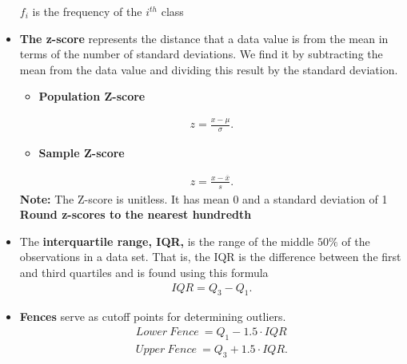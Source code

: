 \documentclass{report}
\begin{document}
\begin{itemize}
                $f_{i}$ is the frequency of the $i^{th}$ class
             \item \textbf{The z-score} represents the distance that a data value is from the mean in terms of the number of standard deviations. We find it by subtracting the mean from the data value and dividing this result by the standard deviation.
                 \begin{itemize}
                     \item \textbf{Population Z-score}
                 \end{itemize}
                 \begin{align*}
                      z = \frac{x - \mu}{\sigma}
                 .\end{align*}
                 \begin{itemize}
                     \item \textbf{Sample Z-score}
                 \end{itemize}
                 \begin{align*}
                     z =\frac{x-\overline{x}}{s}
                 .\end{align*}
                 \textbf{Note:} The Z-score is unitless. It has mean  0 and a standard deviation of 1 \\
                 \textbf{Round z-scores to the nearest hundredth}
                \item The \textbf{interquartile range, IQR,} is the range of the middle $50\% $  of the observations in a data set. That is, the IQR is the difference between the first and third quartiles and is found using this formula  
                    \begin{align*}
                        IQR = Q_{3} - Q_{1}
                    .\end{align*}
                \item \textbf{Fences} serve as cutoff points for determining outliers.
                    \begin{align*}
                        Lower\ Fence\ = Q_{1} - 1.5\cdot IQR \\
                        Upper\ Fence\ = Q_{3} + 1.5\cdot IQR
                    .\end{align*}


\end{itemize}
\end{document}
